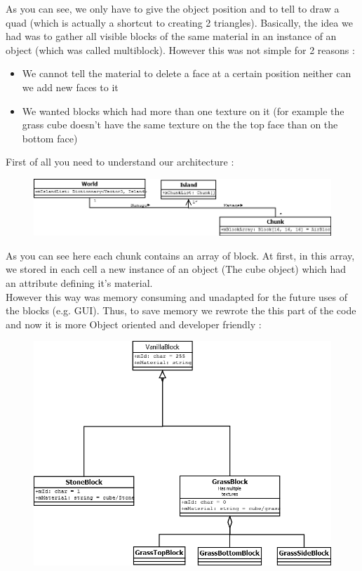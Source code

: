 \documentclass[article]{report}             %
\begin{document}
As you can see, we only have to give the object position and to tell to draw a quad (which is actually a shortcut to creating 2 triangles).
Basically, the idea we had was to gather all visible blocks of the same material in an instance of an object (which was called multiblock). However this was not simple for 2 reasons :
\begin{itemize}
\item We cannot tell the material to delete a face at a certain position neither can we add new faces to it
\item We wanted blocks which had more than one texture on it (for example the grass cube doesn't have the same texture on the the top face than on the bottom
 face)
 \end {itemize}

First of all you need to understand our architecture : 
				\begin{figure}[h]
					\includegraphics[scale=0.5]{images/Hierarchy.png}
				\end{figure}

As you can see here each chunk contains an array of block. At first, in this array, we stored in each cell a new instance of an object (The cube object) which had an attribute defining it's material.\\

However this way was memory consuming and unadapted for the future uses of the blocks (e.g. GUI). Thus, to save memory we rewrote the this part of the code and now it is more Object oriented and developer friendly : 

				\begin{figure}[h]
				\includegraphics[scale=0.5]{images/cubes.png}
				\end{figure}
\end{document}
